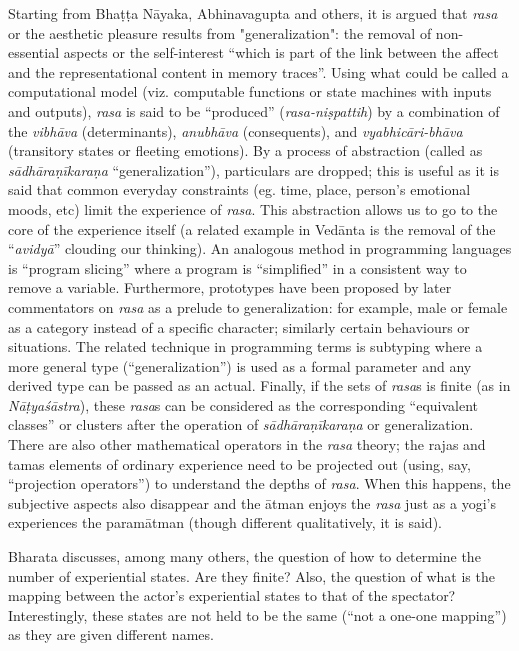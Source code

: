 Starting from Bhaṭṭa Nāyaka, Abhinavagupta and others, it is argued that \textsl{rasa} or the aesthetic pleasure results from "generalization": the removal of non-essential aspects or the self-interest “which is part of the link between the affect and the representational content in memory traces”. Using what could be called a computational model (viz. computable functions or state machines with inputs and outputs), \textsl{rasa} is said to be “produced” (\textsl{rasa-niṣpattih}) by a combination of the \textsl{vibhāva} (determinants), \textsl{anubhāva} (consequents), and \textsl{vyabhicāri-bhāva} (transitory states or fleeting emotions). By a process of abstraction (called as \textsl{sādhāraṇīkaraṇa} “generalization”), particulars are dropped; this is useful as it is said that common everyday constraints (eg. time, place, person’s emotional moods, etc) limit the experience of \textsl{rasa}. This abstraction allows us to go to the core of the experience itself (a related example in Vedānta is the removal of the “\textsl{avidyā}” clouding our thinking). An analogous method in programming languages is “program slicing” where a program is “simplified” in a consistent way to remove a variable. Furthermore, prototypes have been proposed by later commentators on \textsl{rasa} as a prelude to generalization: for example, male or female as a category instead of a specific character; similarly certain behaviours or situations. The related technique in programming terms is subtyping where a more general type (“generalization”) is used as a formal parameter and any derived type can be passed as an actual. Finally, if the sets of \textsl{rasa}s is finite (as in \textsl{Nāṭyaśāstra}), these \textsl{rasa}s can be considered as the corresponding “equivalent classes” or clusters after the operation of \textsl{sādhāraṇīkaraṇa} or generalization. There are also other mathematical operators in the \textsl{rasa} theory; the rajas and tamas elements of ordinary experience need to be projected out (using, say, “projection operators”) to understand the depths of \textsl{rasa}. When this happens, the subjective aspects also disappear and the ātman enjoys the \textsl{rasa} just as a yogi’s experiences the paramātman (though different qualitatively, it is said).

Bharata discusses, among many others, the question of how to determine the number of experiential states. Are they finite? Also, the question of what is the mapping between the actor’s experiential states to that of the spectator? Interestingly, these states are not held to be the same (“not a one-one mapping”) as they are given different names.


